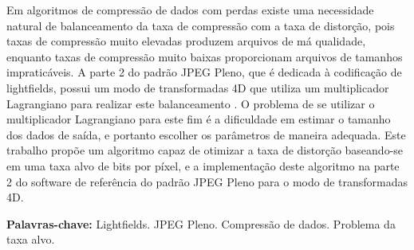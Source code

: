 \begin{resumo}[Resumo]
    Em algoritmos de compressão de dados com perdas existe uma necessidade natural de balanceamento da taxa de compressão com a taxa de distorção,
    pois taxas de compressão muito elevadas produzem arquivos de má qualidade, enquanto taxas de compressão muito baixas proporcionam arquivos de
    tamanhos impraticáveis.
    A parte 2 do padrão JPEG Pleno, que é dedicada à codificação de lightfields, possui um modo de transformadas 4D que utiliza um multiplicador
    Lagrangiano para realizar este balanceamento \cite{4d_codec}. O problema de se utilizar o multiplicador Lagrangiano para este fim é a dificuldade
    em estimar o tamanho dos dados de saída, e portanto escolher os parâmetros de maneira adequada. Este trabalho propõe um algoritmo capaz de 
    otimizar a taxa de distorção baseando-se em uma taxa alvo de bits por píxel, e a implementação deste algoritmo na parte 2 do software de 
    referência do padrão JPEG Pleno para o modo de transformadas 4D.


    \vspace{\baselineskip} 
    \textbf{Palavras-chave:} Lightfields. JPEG Pleno. Compressão de dados. Problema da taxa alvo.
\end{resumo}
